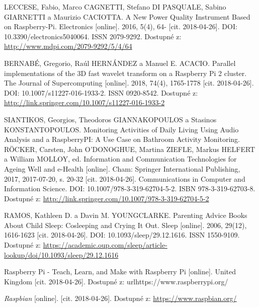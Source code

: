 \documentclass[journal, a4paper]{IEEEtran}
\begin{document}
\begin{thebibliography}{10}

	LECCESE, Fabio, Marco CAGNETTI, Stefano DI PASQUALE, Sabino GIARNETTI a Maurizio CACIOTTA. A New Power Quality Instrument Based on Raspberry-Pi. Electronics [online]. 2016, 5(4), 64- [cit. 2018-04-26]. DOI: 10.3390/electronics5040064. ISSN 2079-9292. Dostupné z: \url{http://www.mdpi.com/2079-9292/5/4/64}
\newline

	BERNABÉ, Gregorio, Raúl HERNÁNDEZ a Manuel E. ACACIO. Parallel implementations of the 3D fast wavelet transform on a Raspberry Pi 2 cluster. The Journal of Supercomputing [online]. 2018, 74(4), 1765-1778 [cit. 2018-04-26]. DOI: 10.1007/s11227-016-1933-2. ISSN 0920-8542. Dostupné z: \url{http://link.springer.com/10.1007/s11227-016-1933-2}
\newline

	SIANTIKOS, Georgios, Theodoros GIANNAKOPOULOS a Stasinos KONSTANTOPOULOS. Monitoring Activities of Daily Living Using Audio Analysis and a RaspberryPI: A Use Case on Bathroom Activity Monitoring. RÖCKER, Carsten, John O'DONOGHUE, Martina ZIEFLE, Markus HELFERT a William MOLLOY, ed. Information and Communication Technologies for Ageing Well and e-Health [online]. Cham: Springer International Publishing, 2017, 2017-07-20, s. 20-32 [cit. 2018-04-26]. Communications in Computer and Information Science. DOI: 10.1007/978-3-319-62704-5-2. ISBN 978-3-319-62703-8. Dostupné z: \url{http://link.springer.com/10.1007/978-3-319-62704-5-2}
\newline

		RAMOS, Kathleen D. a Davin M. YOUNGCLARKE. Parenting Advice Books About Child Sleep: Cosleeping and Crying It Out. Sleep [online]. 2006, 29(12), 1616-1623 [cit. 2018-04-26]. DOI: 10.1093/sleep/29.12.1616. ISSN 1550-9109. Dostupné z: \url{https://academic.oup.com/sleep/article-lookup/doi/10.1093/sleep/29.12.1616}
\newline	

		Raspberry Pi - Teach, Learn, and Make with Raspberry Pi [online]. United Kingdom [cit. 2018-04-26]. Dostupné z: url{https://www.raspberrypi.org/}
\newline

		\textit{Raspbian} [online]. [cit. 2018-04-26]. Dostupné z: \url{https://www.raspbian.org/}



\end{thebibliography}
\end{document}
